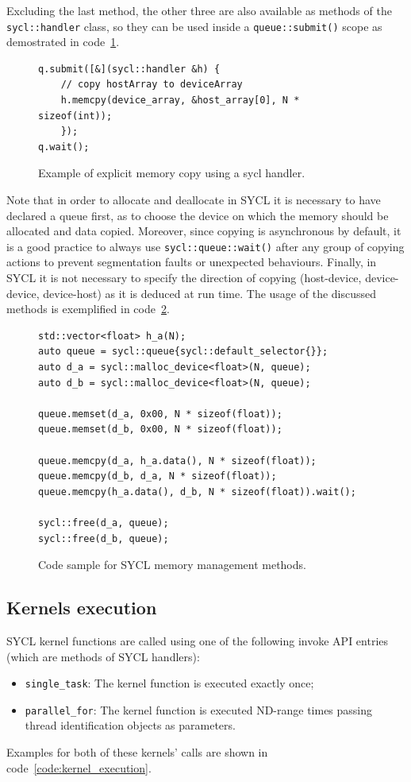 Excluding the last method, the other three are also available as methods of the \Verb "sycl::handler" class, so they can be used inside a \Verb "queue::submit()" scope as demostrated in code~\ref{code:handler_copy}.


\begin{figure}[ht!]
\renewcommand{\figurename}{Code}
\begin{verbatim}
q.submit([&](sycl::handler &h) {
    // copy hostArray to deviceArray
    h.memcpy(device_array, &host_array[0], N * sizeof(int));
    });
q.wait();
\end{verbatim}
\caption{Example of explicit memory copy using a sycl handler.}
\label{code:handler_copy}
\end{figure}

Note that in order to allocate and deallocate in SYCL it is necessary to have declared a queue first, as to choose the device on which the memory should be allocated and data copied. Moreover, since copying is asynchronous by default, it is a good practice to always use \Verb "sycl::queue::wait()" after any group of copying actions to prevent segmentation faults or unexpected behaviours. Finally, in SYCL it is not necessary to specify the direction of copying (host-device, device-device, device-host) as it is deduced at run time. The usage of the discussed methods is exemplified in code~\ref{code:sycl_memory}.

\begin{figure}[ht!]
\renewcommand{\figurename}{Code}
\begin{verbatim}
std::vector<float> h_a(N);
auto queue = sycl::queue{sycl::default_selector{}};
auto d_a = sycl::malloc_device<float>(N, queue);
auto d_b = sycl::malloc_device<float>(N, queue);

queue.memset(d_a, 0x00, N * sizeof(float));
queue.memset(d_b, 0x00, N * sizeof(float));

queue.memcpy(d_a, h_a.data(), N * sizeof(float));
queue.memcpy(d_b, d_a, N * sizeof(float));
queue.memcpy(h_a.data(), d_b, N * sizeof(float)).wait();

sycl::free(d_a, queue);
sycl::free(d_b, queue);
\end{verbatim}
\caption{Code sample for SYCL memory management methods.}
\label{code:sycl_memory}
\end{figure}

\subsection{Kernels execution}
\label{ch:kernels_execution}
SYCL kernel functions are called using one of the following invoke API entries (which are methods of SYCL handlers):
\begin{itemize}
    \item \Verb "single_task": The kernel function is executed exactly once;
    \item \Verb "parallel_for": The kernel function is executed ND-range times passing thread identification objects as parameters.
\end{itemize}
Examples for both of these kernels' calls are shown in code~\ref{code:kernel_execution}.

